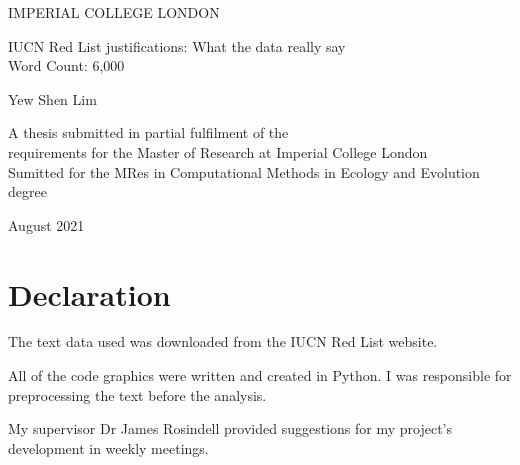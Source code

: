 \documentclass[a4paper,11]{article}
\begin{document}
	\begin{center}
		{\large IMPERIAL COLLEGE LONDON}
	\end{center}
	\vspace{6cm}
	
	\begin{center}
		
		\Huge IUCN Red List justifications: What the data really say\\		
		\vspace{.5cm}		
		\large {Word Count: 6,000}
		
	\end{center}
	\vspace{2.5cm}
	\begin{center}
		\Large Yew Shen Lim
	\end{center}
	
	\vspace{8cm}
	\begin{center}
		{\large A thesis submitted in partial fulfilment of the \\requirements for the Master of Research at Imperial College London \\ Sumitted for the MRes in Computational Methods in Ecology and Evolution degree}
	\end{center}
	
	\begin{center}
		{\large August 2021}
	\end{center}		

	\newpage

\section*{Declaration}

The text data used was downloaded from the IUCN Red List website.

All of the code graphics were written and created in Python. I was responsible for preprocessing the text before the analysis.

My supervisor Dr James Rosindell provided suggestions for my project's development in weekly meetings.

\pagebreak

\end{document}

